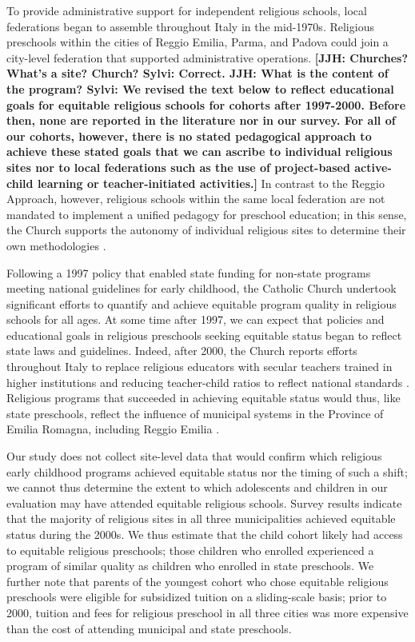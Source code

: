 To provide administrative support for independent religious schools, local federations began to assemble throughout Italy in the mid-1970s. Religious preschools within the cities of Reggio Emilia, Parma, and Padova could join a city-level federation that supported administrative operations. \textbf{[JJH: Churches? What's a site? Church? Sylvi: Correct. JJH: What is the content of the program? Sylvi: We revised the text below to reflect educational goals for equitable religious schools for cohorts after 1997-2000. Before then, none are reported in the literature nor in our survey. For all of our cohorts, however, there is no stated pedagogical approach to achieve these stated goals that we can ascribe to individual religious sites nor to local federations such as the use of project-based active-child learning or teacher-initiated activities.]} In contrast to the Reggio Approach, however, religious schools within the same local federation are not mandated to implement a unified pedagogy for preschool education; in this sense, the Church supports the autonomy of individual religious sites to determine their own methodologies \citep{Malizia-Cicatelli_2011_BOOK_Catholic-School}. 

Following a 1997 policy that enabled state funding for non-state programs meeting national guidelines for early childhood, the Catholic Church undertook significant efforts to quantify and achieve equitable program quality in religious schools for all ages. At some time after 1997, we can expect that policies and educational goals in religious preschools seeking equitable status began to reflect state laws and guidelines. Indeed, after 2000, the Church reports efforts throughout Italy to replace religious educators with secular teachers trained in higher institutions and reducing teacher-child ratios to reflect national standards \citep{Malizia-Cicatelli_2011_BOOK_Catholic-School}. Religious programs that succeeded in achieving equitable status would thus, like state preschools, reflect the influence of municipal systems in the Province of Emilia Romagna, including Reggio Emilia \citep{Hohnerlein_2009_Paradox-Public-Preschools,OECD_2001_Italy-Country-Note}. 

Our study does not collect site-level data that would confirm which religious early childhood programs achieved equitable status nor the timing of such a shift; we cannot thus determine the extent to which adolescents and children in our evaluation may have attended equitable religious schools. Survey results indicate that the majority of religious sites in all three municipalities achieved equitable status during the 2000s. We thus estimate that the child cohort likely had access to equitable religious preschools; those children who enrolled experienced a program of similar quality as children who enrolled in state preschools. We further note that parents of the youngest cohort who chose equitable religious preschools were eligible for subsidized tuition on a sliding-scale basis; prior to 2000, tuition and fees for religious preschool in all three cities was more expensive than the cost of attending municipal and state preschools.

